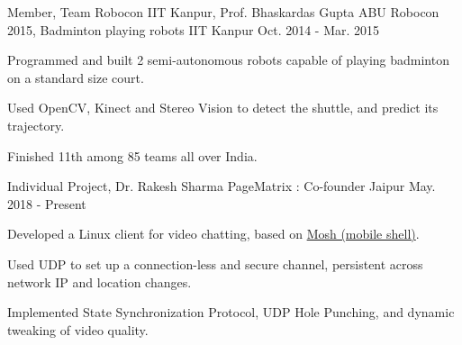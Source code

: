 \begin{cventries}
  
  \cventry
  {Member, Team Robocon IIT Kanpur, Prof. Bhaskardas Gupta}
  {ABU Robocon 2015, Badminton playing robots}
  {IIT Kanpur}
  {Oct. 2014 - Mar. 2015}
  {
    \begin{cvitems}
    \item Programmed and built 2 semi-autonomous robots
      capable of playing badminton on a standard size court.
    \item Used OpenCV, Kinect and Stereo Vision to detect the shuttle,
      and predict its trajectory.
    \item Finished 11th among 85 teams all over India.
    \end{cvitems}
  }

  \cventry
  {Individual Project, Dr. Rakesh Sharma}
  {PageMatrix : Co-founder}
  {Jaipur}
  {May. 2018 - Present}
  {
    \begin{cvitems}
    \item Developed a Linux client for video chatting,
      based on \href{https://mosh.org/}{Mosh (mobile shell)}.
    \item Used UDP to set up a connection-less and secure channel,
      persistent across network IP and location changes.
    \item Implemented State Synchronization Protocol, UDP Hole
      Punching, and dynamic tweaking of video quality.
    \end{cvitems}
  }
  


\end{cventries}

